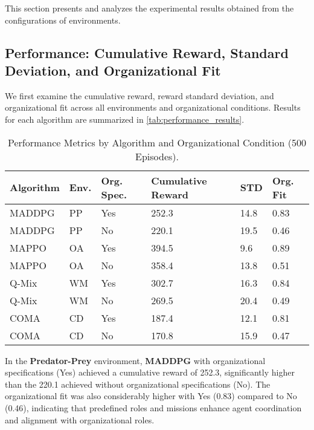 \documentclass[sigconf,anonymous]{aamas}
\begin{document}
This section presents and analyzes the experimental results obtained from the configurations of environments.

\subsection{Performance: Cumulative Reward, Standard Deviation, and Organizational Fit}

We first examine the cumulative reward, reward standard deviation, and organizational fit across all environments and organizational conditions. Results for each algorithm are summarized in \autoref{tab:performance_results}.

\begin{table}[h!]
    \centering
    \caption{Performance Metrics by Algorithm and Organizational Condition (500 Episodes).}
    \label{tab:performance_results}
    \small
    \renewcommand{\arraystretch}{1.1}
    \begin{tabular}{p{1.4cm}p{0.5cm}p{}p{1.3cm}p{}p{}}
        \hline
        \textbf{Algorithm} & \textbf{Env.} & \textbf{Org. Spec.} & \textbf{Cumulative Reward} & \textbf{STD} & \textbf{Org. Fit} \\ \hline
        MADDPG & PP & Yes & 252.3 & 14.8 & 0.83 \\
        MADDPG & PP & No & 220.1 & 19.5 & 0.46 \\
        MAPPO & OA & Yes & 394.5 & 9.6 & 0.89 \\
        MAPPO & OA & No & 358.4 & 13.8 & 0.51 \\
        Q-Mix & WM & Yes & 302.7 & 16.3 & 0.84 \\
        Q-Mix & WM & No & 269.5 & 20.4 & 0.49 \\
        COMA & CD & Yes & 187.4 & 12.1 & 0.81 \\
        COMA & CD & No & 170.8 & 15.9 & 0.47 \\ \hline
    \end{tabular}
\end{table}

In the \textbf{Predator-Prey} environment, \textbf{MADDPG} with organizational specifications (Yes) achieved a cumulative reward of 252.3, significantly higher than the 220.1 achieved without organizational specifications (No). The organizational fit was also considerably higher with Yes (0.83) compared to No (0.46), indicating that predefined roles and missions enhance agent coordination and alignment with organizational roles.
\end{document}
